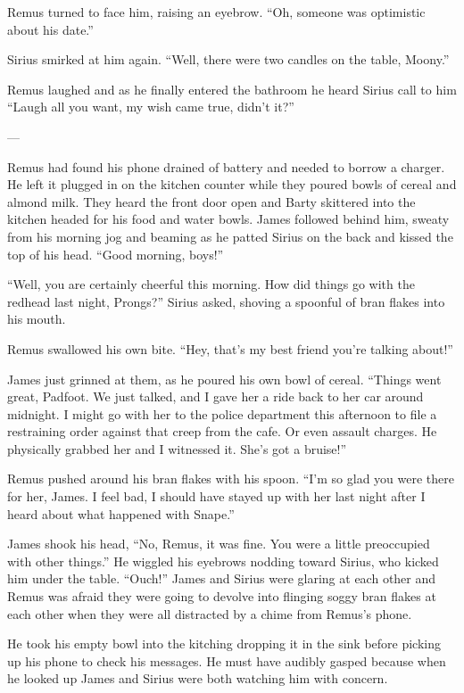 \documentclass[12pt,twoside,openright]{memoir}
\begin{document}
Remus turned to face him, raising an eyebrow. ``Oh, someone was optimistic about his date.''

Sirius smirked at him again. ``Well, there were two candles on the table, Moony.''

Remus laughed and as he finally entered the bathroom he heard Sirius call to him ``Laugh all you want, my wish came true, didn't it?''

---

Remus had found his phone drained of battery and needed to borrow a charger. He left it plugged in on the kitchen counter while they poured bowls of cereal and almond milk. They heard the front door open and Barty skittered into the kitchen headed for his food and water bowls. James followed behind him, sweaty from his morning jog and beaming as he patted Sirius on the back and kissed the top of his head. ``Good morning, boys!''

``Well, you are certainly cheerful this morning. How did things go with the redhead last night, Prongs?'' Sirius asked, shoving a spoonful of bran flakes into his mouth.

Remus swallowed his own bite. ``Hey, that's my best friend you're talking about!''

James just grinned at them, as he poured his own bowl of cereal. ``Things went great, Padfoot. We just talked, and I gave her a ride back to her car around midnight. I might go with her to the police department this afternoon to file a restraining order against that creep from the cafe. Or even assault charges. He physically grabbed her and I witnessed it. She's got a bruise!''

Remus pushed around his bran flakes with his spoon. ``I'm so glad you were there for her, James. I feel bad, I should have stayed up with her last night after I heard about what happened with Snape.''

James shook his head, ``No, Remus, it was fine. You were a little preoccupied with other things.'' He wiggled his eyebrows nodding toward Sirius, who kicked him under the table. ``Ouch!'' James and Sirius were glaring at each other and Remus was afraid they were going to devolve into flinging soggy bran flakes at each other when they were all distracted by a chime from Remus's phone.

He took his empty bowl into the kitching dropping it in the sink before picking up his phone to check his messages. He must have audibly gasped because when he looked up James and Sirius were both watching him with concern.
\end{document}
